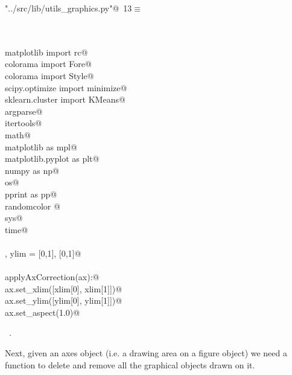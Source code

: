 \documentclass[11.5pt]{report}
\begin{document}
\begin{flushleft} \small\label{scrap2}\raggedright\small
{} \verb@"../src/lib/utils_graphics.py"@\nobreak\ {\footnotesize {13}}$\equiv$
\vspace{-1ex}
\begin{list}{}{} \item
\mbox{}\verb@@\\
\mbox{}\verb@@\\
\mbox{}\verb@from matplotlib import rc@\\
\mbox{}\verb@from colorama import Fore@\\
\mbox{}\verb@from colorama import Style@\\
\mbox{}\verb@from scipy.optimize import minimize@\\
\mbox{}\verb@from sklearn.cluster import KMeans@\\
\mbox{}\verb@import argparse@\\
\mbox{}\verb@import itertools@\\
\mbox{}\verb@import math@\\
\mbox{}\verb@import matplotlib as mpl@\\
\mbox{}\verb@import matplotlib.pyplot as plt@\\
\mbox{}\verb@import numpy as np@\\
\mbox{}\verb@import os@\\
\mbox{}\verb@import pprint as pp@\\
\mbox{}\verb@import randomcolor @\\
\mbox{}\verb@import sys@\\
\mbox{}\verb@import time@\\
\mbox{}\verb@@\\
\mbox{}\verb@xlim, ylim = [0,1], [0,1]@\\
\mbox{}\verb@@\\
\mbox{}\verb@def applyAxCorrection(ax):@\\
\mbox{}\verb@      ax.set_xlim([xlim[0], xlim[1]])@\\
\mbox{}\verb@      ax.set_ylim([ylim[0], ylim[1]])@\\
\mbox{}\verb@      ax.set_aspect(1.0)@\\
\mbox{}\verb@@{\NWsep}
\end{list}
\vspace{-1.5ex}
\footnotesize
\begin{list}{}{\setlength{\itemsep}{-\parsep}\setlength{\itemindent}{-\leftmargin}}
\item \NWtxtFileDefBy\ .

\item{}
\end{list}
\vspace{4ex}
\end{flushleft}
\newchunk Next, given an axes object (i.e. a drawing area on a figure object) we need a function
to delete and remove all the graphical objects drawn on it. 
\end{document}
